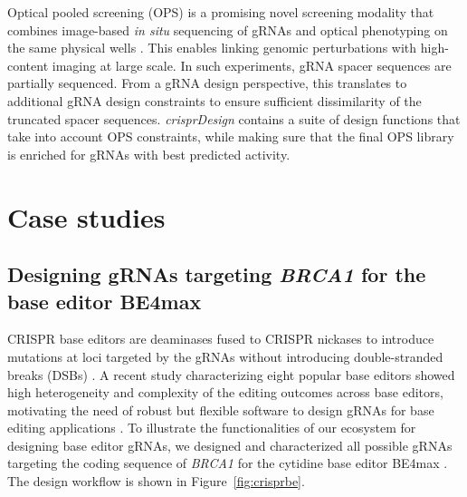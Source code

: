 \documentclass[pdftex,english,10pt]{article}
\begin{document}
Optical pooled screening (OPS) is a promising novel screening modality that combines image-based \textit{in situ} sequencing of gRNAs and optical phenotyping on the same physical wells \citep{ops}. This enables linking genomic perturbations with high-content imaging at large scale. In such experiments, gRNA spacer sequences are partially sequenced. From a gRNA design perspective, this translates to additional gRNA design constraints to ensure sufficient dissimilarity of the truncated spacer sequences.  \textit{crisprDesign} contains a suite of design functions that take into account OPS constraints, while making sure that the final OPS library is enriched for gRNAs with best predicted activity. 




\section{Case studies}



\subsection{Designing gRNAs targeting \textit{BRCA1} for the base editor BE4max} 




CRISPR base editors are deaminases fused to CRISPR nickases to introduce mutations at loci targeted by the gRNAs without introducing double-stranded breaks (DSBs) \cite{gaudelli,komor}. A recent study characterizing eight popular base editors showed high heterogeneity and complexity of the editing outcomes across base editors, motivating the need of robust but flexible software to design gRNAs for base editing applications \citep{behive}. To illustrate the functionalities of our ecosystem for designing base editor gRNAs, we designed and characterized all possible gRNAs targeting the coding sequence of \textit{BRCA1} for the cytidine base editor BE4max \citep{koblan2018improving}. The design workflow is shown in Figure~\ref{fig:crisprbe}. 
\end{document}
